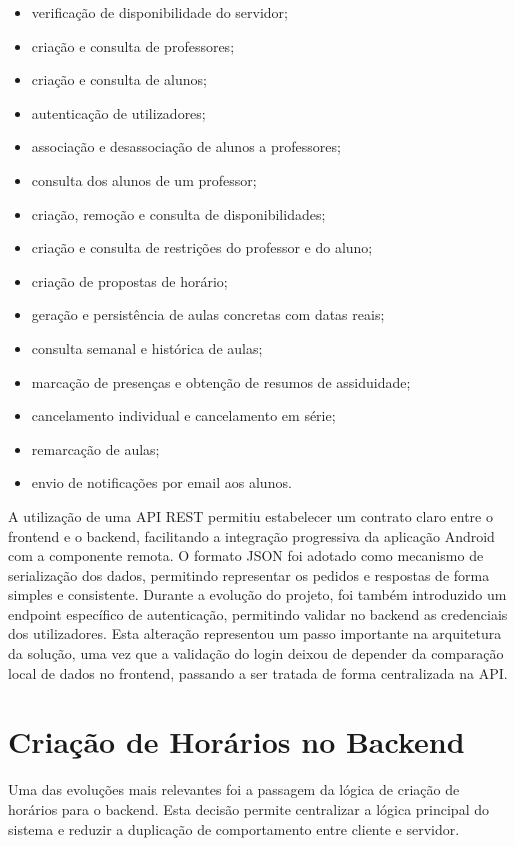 \begin{itemize}
    \item verificação de disponibilidade do servidor;
    \item criação e consulta de professores;
    \item criação e consulta de alunos;
    \item autenticação de utilizadores;
    \item associação e desassociação de alunos a professores;
    \item consulta dos alunos de um professor;
    \item criação, remoção e consulta de disponibilidades;
    \item criação e consulta de restrições do professor e do aluno;
    \item criação de propostas de horário;
    \item geração e persistência de aulas concretas com datas reais;
    \item consulta semanal e histórica de aulas;
    \item marcação de presenças e obtenção de resumos de assiduidade;
    \item cancelamento individual e cancelamento em série;
    \item remarcação de aulas;
    \item envio de notificações por email aos alunos.
\end{itemize}

A utilização de uma API REST permitiu estabelecer um contrato claro entre o frontend e o backend, facilitando a integração progressiva da aplicação Android com a componente remota.
O formato JSON foi adotado como mecanismo de serialização dos dados, permitindo representar os pedidos e respostas de forma simples e consistente.
Durante a evolução do projeto, foi também introduzido um endpoint específico de autenticação, permitindo validar no backend as credenciais dos utilizadores.
Esta alteração representou um passo importante na arquitetura da solução, uma vez que a validação do login deixou de depender da comparação local de dados no frontend,
passando a ser tratada de forma centralizada na API.

\section{Criação de Horários no Backend}

Uma das evoluções mais relevantes foi a passagem da lógica de criação de horários para o backend.
Esta decisão permite centralizar a lógica principal do sistema e reduzir a duplicação de comportamento entre cliente e servidor.

